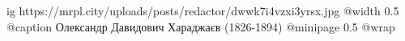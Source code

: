  
 
 
 
 

\ifcmt
  ig https://mrpl.city/uploads/posts/redactor/dwwk7i4vzxi3yrsx.jpg
  @width 0.5
	@caption Олександр Давидович Хараджаєв (1826-1894)
  @minipage 0.5
  @wrap \parpic[r]
\fi
